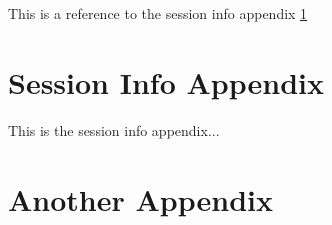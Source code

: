 This is a reference to the session info appendix \ref{appendix:sessinfo}

\begin{appendices}

\section{Session Info Appendix}
\label{appendix:sessinfo}
This is the session info appendix...

\section{Another Appendix}

\end{appendices}